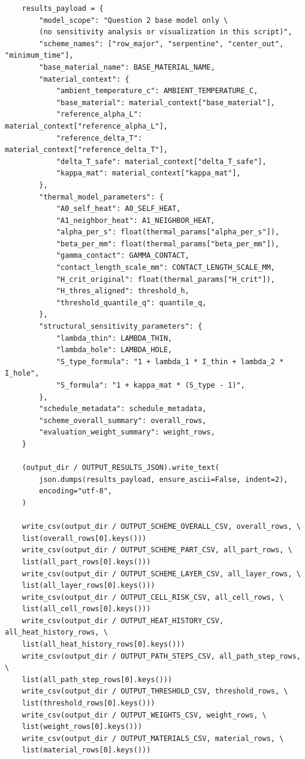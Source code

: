 \documentclass[a4paper, 12pt]{ctexart}
\begin{document}
\begin{verbatim}
    results_payload = {
        "model_scope": "Question 2 base model only \
        (no sensitivity analysis or visualization in this script)",
        "scheme_names": ["row_major", "serpentine", "center_out", "minimum_time"],
        "base_material_name": BASE_MATERIAL_NAME,
        "material_context": {
            "ambient_temperature_c": AMBIENT_TEMPERATURE_C,
            "base_material": material_context["base_material"],
            "reference_alpha_L": material_context["reference_alpha_L"],
            "reference_delta_T": material_context["reference_delta_T"],
            "delta_T_safe": material_context["delta_T_safe"],
            "kappa_mat": material_context["kappa_mat"],
        },
        "thermal_model_parameters": {
            "A0_self_heat": A0_SELF_HEAT,
            "A1_neighbor_heat": A1_NEIGHBOR_HEAT,
            "alpha_per_s": float(thermal_params["alpha_per_s"]),
            "beta_per_mm": float(thermal_params["beta_per_mm"]),
            "gamma_contact": GAMMA_CONTACT,
            "contact_length_scale_mm": CONTACT_LENGTH_SCALE_MM,
            "H_crit_original": float(thermal_params["H_crit"]),
            "H_thres_aligned": threshold_h,
            "threshold_quantile_q": quantile_q,
        },
        "structural_sensitivity_parameters": {
            "lambda_thin": LAMBDA_THIN,
            "lambda_hole": LAMBDA_HOLE,
            "S_type_formula": "1 + lambda_1 * I_thin + lambda_2 * I_hole",
            "S_formula": "1 + kappa_mat * (S_type - 1)",
        },
        "schedule_metadata": schedule_metadata,
        "scheme_overall_summary": overall_rows,
        "evaluation_weight_summary": weight_rows,
    }

    (output_dir / OUTPUT_RESULTS_JSON).write_text(
        json.dumps(results_payload, ensure_ascii=False, indent=2),
        encoding="utf-8",
    )

    write_csv(output_dir / OUTPUT_SCHEME_OVERALL_CSV, overall_rows, \
    list(overall_rows[0].keys()))
    write_csv(output_dir / OUTPUT_SCHEME_PART_CSV, all_part_rows, \
    list(all_part_rows[0].keys()))
    write_csv(output_dir / OUTPUT_SCHEME_LAYER_CSV, all_layer_rows, \
    list(all_layer_rows[0].keys()))
    write_csv(output_dir / OUTPUT_CELL_RISK_CSV, all_cell_rows, \
    list(all_cell_rows[0].keys()))
    write_csv(output_dir / OUTPUT_HEAT_HISTORY_CSV, all_heat_history_rows, \
    list(all_heat_history_rows[0].keys()))
    write_csv(output_dir / OUTPUT_PATH_STEPS_CSV, all_path_step_rows, \
    list(all_path_step_rows[0].keys()))
    write_csv(output_dir / OUTPUT_THRESHOLD_CSV, threshold_rows, \
    list(threshold_rows[0].keys()))
    write_csv(output_dir / OUTPUT_WEIGHTS_CSV, weight_rows, \
    list(weight_rows[0].keys()))
    write_csv(output_dir / OUTPUT_MATERIALS_CSV, material_rows, \
    list(material_rows[0].keys()))


\end{verbatim}
\end{document}
